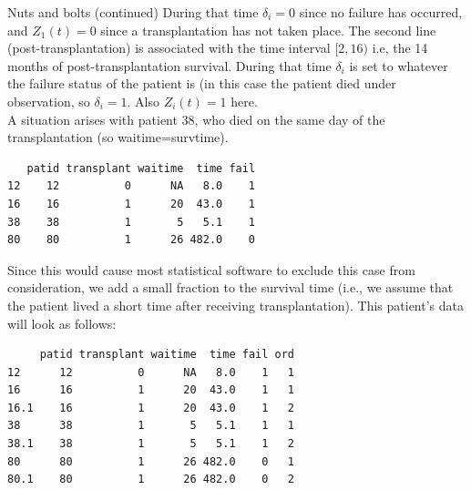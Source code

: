 \documentclass[envcountsect, 10pt, portrait, palatino]{beamer}
\begin{document}
\begin{frame}[fragile]{Nuts and bolts (continued)}
During that time $\delta_i=0$ since no failure has occurred, and $Z_1(t)=0$ since a transplantation has not taken place.  The second line (post-transplantation) is associated with the time interval $[2,16)$ i.e, the 14 months of post-transplantation survival. During that time $\delta_i$ is set to whatever the failure status of the patient is (in this case the patient died under observation, so $\delta_i=1$.  Also $Z_i(t)=1$ here.
\\[2ex]
A situation arises with patient 38, who died on the same day of the transplantation (so \textsf{waitime}=\textsf{survtime}).

\scriptsize
\begin{verbatim}
   patid transplant waitime  time fail
12    12          0      NA   8.0    1
16    16          1      20  43.0    1
38    38          1       5   5.1    1
80    80          1      26 482.0    0
\end{verbatim}
\normalsize
Since this would cause most statistical software to exclude this case from consideration, we add a small fraction to the survival time (i.e., we assume that the patient lived a short time after receiving transplantation).  This patient's data will look as follows:
\tiny
\begin{verbatim}
     patid transplant waitime  time fail ord
12      12          0      NA   8.0    1   1
16      16          1      20  43.0    1   1
16.1    16          1      20  43.0    1   2
38      38          1       5   5.1    1   1
38.1    38          1       5   5.1    1   2
80      80          1      26 482.0    0   1
80.1    80          1      26 482.0    0   2
\end{verbatim}
\normalsize
\end{frame} 
\end{document}

